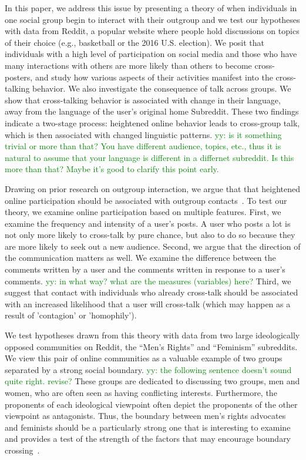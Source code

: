 \documentclass[letterpaper]{article}
\newcommand{\fabio}[1]{{\textcolor{blue}{fabio: #1}}}
\newcommand{\yy}[1]{{\textcolor{green}{yy: #1}}}
\newcommand{\pat}[1]{{\textcolor{red}{Pat: #1}}}
\begin{document}
In this paper, we address this issue by presenting a theory of when individuals in one social group begin to interact with their outgroup and we test our hypotheses with data from Reddit, a popular website where people hold discussions on topics of their choice (e.g., basketball or the 2016 U.S. election). We posit that individuals with a high level of participation on social media and those who have many interactions with others are more likely than others to become cross-posters, and study how various aspects of their activities manifest into the cross-talking behavior. We also investigate the consequence of talk across groups. We show that cross-talking behavior is associated with change in their language, away from the language of the user's original home Subreddit. These two findings indicate a two-stage process: heightened online behavior leads to cross-group talk, which is then associated with changed linguistic patterns. \yy{is it something trivial or more than that? You have different audience, topics, etc., thus it is natural to assume that your language is different in a differnet subreddit. Is this more than that? Maybe it's good to clarify this point early. } 

Drawing on prior research on outgroup interaction, we argue that that heightened online participation should be associated with outgroup contacts~\cite{pettigrew1998intergroup}. To test our theory, we examine online participation based on multiple features. First, we examine the frequency and intensity of a user's posts. A user who posts a lot is not only more likely to cross-talk by pure chance, but also to do so because they are more likely to seek out a new audience. Second, we argue that the direction of the communication matters as well. We examine the difference between the comments written by a user and the comments written in response to a user's comments. \yy{in what way? what are the measures (variables) here?} Third, we suggest that contact with individuals who already cross-talk should be associated with an increased likelihood that a user will cross-talk (which may happen as a result of 'contagion' or 'homophily'). 

We test hypotheses drawn from this theory with data from two large ideologically opposed communities on Reddit, the ``Men's Rights'' and ``Feminism'' subreddits. We view this pair of online communities as a valuable example of two groups separated by a strong social boundary. \yy{the following sentence doesn't sound quite right. revise?} These groups are dedicated to discussing two groups, men and women, who are often seen as having conflicting interests. Furthermore, the proponents of each ideological viewpoint often depict the proponents of the other viewpoint as antagonists. Thus, the boundary between men's rights advocates and feminists should be a particularly strong one that is interesting to examine and provides a test of the strength of the factors that may encourage boundary crossing~\cite{menzies2007backlash,messner2000politicsofmasculinities}. %
\end{document}
